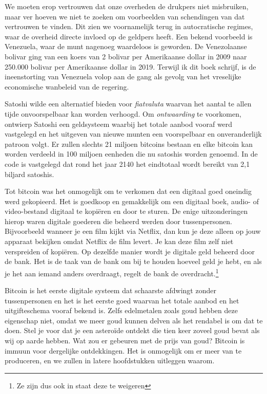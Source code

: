 We moeten erop vertrouwen dat onze overheden de drukpers niet misbruiken, maar ver hoeven we niet te zoeken om voorbeelden van schendingen van dat vertrouwen te vinden. Dit zien we voornamelijk terug in autocratische regimes, waar de overheid directe invloed op de geldpers heeft. Een bekend voorbeeld is Venezuela, waar de munt nagenoeg waardeloos is geworden. De Venezolaanse bolivar ging van een koers van 2 bolivar per Amerikaanse dollar in 2009 naar 250.000 bolivar per Amerikaanse dollar in 2019. Terwijl ik dit boek schrijf, is de ineenstorting van Venezuela volop aan de gang als gevolg van het vreselijke economische wanbeleid van de regering.

Satoshi wilde een alternatief bieden voor \textit{fiatvaluta} waarvan het aantal te allen tijde onvoorspelbaar kan worden verhoogd. Om \textit{ontwaarding} te voorkomen, ontwierp Satoshi een geldsysteem waarbij het totale aanbod vooraf werd vastgelegd en het uitgeven van nieuwe munten een voorspelbaar en onveranderlijk patroon volgt. Er zullen slechts 21 miljoen bitcoins bestaan en elke bitcoin kan worden verdeeld in 100 miljoen eenheden die nu satoshis worden genoemd. In de code is vastgelegd dat rond het jaar 2140 het eindtotaal wordt bereikt van 2,1 biljard satoshis.

Tot bitcoin was het onmogelijk om te verkomen dat een digitaal goed oneindig werd gekopieerd. Het is goedkoop en gemakkelijk om een digitaal boek, audio- of video-bestand digitaal te kopiëren en door te sturen. De enige uitzonderingen hierop waren digitale goederen die beheerd werden door tussenpersonen. Bijvoorbeeld wanneer je een film kijkt via Netflix, dan kun je deze alleen op jouw apparaat bekijken omdat Netflix de film levert. Je kan deze film zelf niet verspreiden of kopiëren. Op dezelfde manier wordt je digitale geld beheerd door de bank. Het is de taak van de bank om bij te houden hoeveel geld je hebt, en als je het aan iemand anders overdraagt, regelt de bank de overdracht.\footnote{Ze zijn dus ook in staat deze te weigeren}

Bitcoin is het eerste digitale systeem dat schaarste afdwingt zonder tussenpersonen en het is het eerste goed waarvan het totale aanbod en het uitgifteschema vooraf bekend is. Zelfs edelmetalen zoals goud hebben deze eigenschap niet, omdat we meer goud kunnen delven als het rendabel is om dat te doen. Stel je voor dat je een asteroïde ontdekt die tien keer zoveel goud bevat als wij op aarde hebben. Wat zou er gebeuren met de prijs van goud? Bitcoin is immuun voor dergelijke ontdekkingen. Het is onmogelijk om er meer van te produceren, en we zullen in latere hoofdstukken uitleggen waarom.
 
